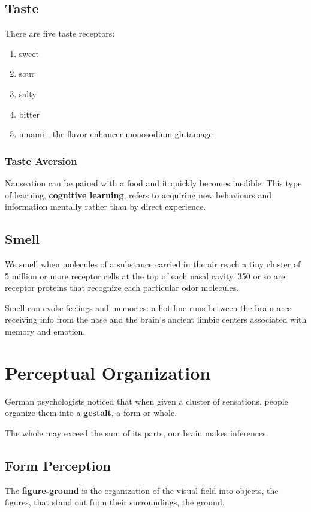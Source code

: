 \documentclass[12pt]{article}
\begin{document}
\subsection*{Taste}
There are five taste receptors:
\begin{enumerate}
\item sweet
\item sour
\item salty
\item bitter
\item umami - the flavor enhancer monosodium glutamage
\end{enumerate}

\subsubsection*{Taste Aversion}
Nauseation can be paired with a food and it quickly becomes inedible. This type of learning, {\bf cognitive learning}, refers to acquiring new behaviours and information mentally rather than by direct experience.

\subsection*{Smell}
We smell when molecules of a substance carried in the air reach a tiny cluster of 5 million or more receptor cells at the top of each nasal cavity. 350 or so are receptor proteins that recognize each particular odor molecules.

Smell can evoke feelings and memories: a hot-line runs between the brain area receiving info from the nose and the brain's ancient limbic centers associated with memory and emotion.

\section*{Perceptual Organization}
German psychologists noticed that when given a cluster of sensations, people organize them into a \textbf{gestalt}, a form or whole.

The whole may exceed the sum of its parts, our brain makes inferences.

\subsection*{Form Perception}
The \textbf{figure-ground} is the organization of the visual field into objects, the figures, that stand out from their surroundings, the ground.
\end{document}
